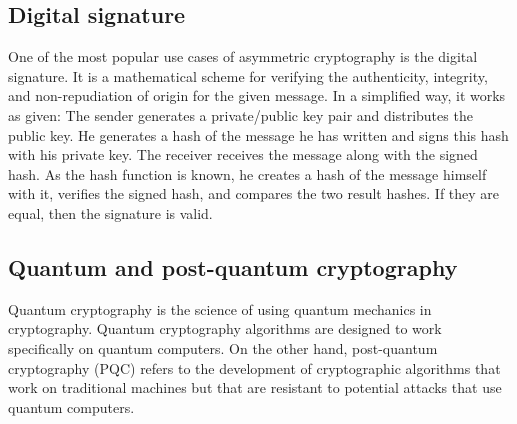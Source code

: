 \subsection{Digital signature}
One of the most popular use cases of asymmetric cryptography is the digital signature. It is a mathematical scheme for verifying the authenticity, integrity, and non-repudiation of origin for the given message. In a simplified way, it works as given: The sender generates a private/public key pair and distributes the public key. He generates a hash of the message he has written and signs this hash with his private key. The receiver receives the message along with the signed hash. As the hash function is known, he creates a hash of the message himself with it, verifies the signed hash, and compares the two result hashes. If they are equal, then the signature is valid.

\subsection{Quantum and post-quantum cryptography}
Quantum cryptography is the science of using quantum mechanics in cryptography. Quantum cryptography algorithms are designed to work specifically on quantum computers.
On the other hand, post-quantum cryptography (PQC) refers to the development of cryptographic algorithms that work on traditional machines but that are resistant to potential attacks that use quantum computers.

